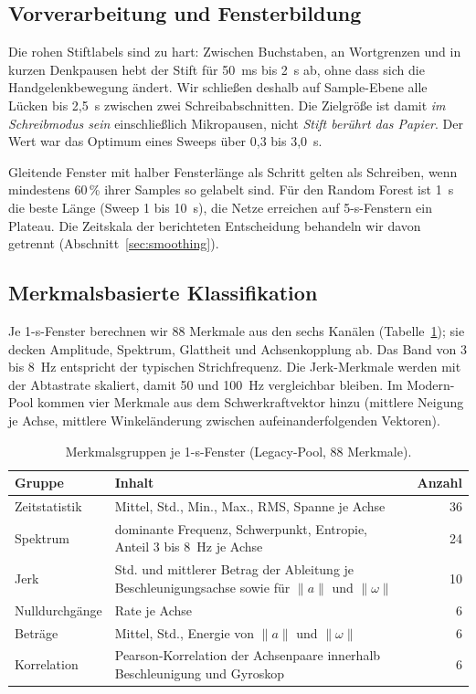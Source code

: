 \subsection{Vorverarbeitung und Fensterbildung}
\label{sec:windows}

Die rohen Stiftlabels sind zu hart: Zwischen Buchstaben, an Wortgrenzen und
in kurzen Denkpausen hebt der Stift für 50~ms bis 2~s ab, ohne dass sich die
Handgelenkbewegung ändert. Wir schließen deshalb auf Sample-Ebene alle Lücken
bis 2,5~s zwischen zwei Schreibabschnitten. Die Zielgröße ist damit \emph{im
Schreibmodus sein} einschließlich Mikropausen, nicht \emph{Stift berührt das
Papier}. Der Wert war das Optimum eines Sweeps über 0,3 bis 3,0~s.

Gleitende Fenster mit halber Fensterlänge als Schritt gelten als Schreiben,
wenn mindestens 60\,\% ihrer Samples so gelabelt sind. Für den Random Forest
ist 1~s die beste Länge (Sweep 1 bis 10~s), die Netze erreichen auf
5-s-Fenstern ein Plateau. Die Zeitskala der berichteten Entscheidung
behandeln wir davon getrennt (Abschnitt~\ref{sec:smoothing}).

\subsection{Merkmalsbasierte Klassifikation}
\label{sec:rf}

Je 1-s-Fenster berechnen wir 88 Merkmale aus den sechs Kanälen
(Tabelle~\ref{tab:features}); sie decken Amplitude, Spektrum, Glattheit und
Achsenkopplung ab. Das Band von 3 bis 8~Hz entspricht der typischen
Strichfrequenz. Die Jerk-Merkmale werden mit der Abtastrate skaliert, damit
50 und 100~Hz vergleichbar bleiben. Im Modern-Pool kommen vier Merkmale aus
dem Schwerkraftvektor hinzu (mittlere Neigung je Achse, mittlere
Winkeländerung zwischen aufeinanderfolgenden Vektoren).

\begin{table}[H]
  \centering
  \caption{Merkmalsgruppen je 1-s-Fenster (Legacy-Pool, 88 Merkmale).}
  \label{tab:features}
  \small
  \begin{tabular}{p{28mm}p{95mm}r}
    \hline
    \textbf{Gruppe} & \textbf{Inhalt} & \textbf{Anzahl} \\ \hline \hline
    Zeitstatistik & Mittel, Std., Min., Max., RMS, Spanne je Achse & 36 \\
    Spektrum & dominante Frequenz, Schwerpunkt, Entropie, Anteil 3 bis 8~Hz je Achse & 24 \\
    Jerk & Std. und mittlerer Betrag der Ableitung je Beschleunigungsachse sowie für $\|a\|$ und $\|\omega\|$ & 10 \\
    Nulldurchgänge & Rate je Achse & 6 \\
    Beträge & Mittel, Std., Energie von $\|a\|$ und $\|\omega\|$ & 6 \\
    Korrelation & Pearson-Korrelation der Achsenpaare innerhalb Beschleunigung und Gyroskop & 6 \\ \hline
  \end{tabular}
\end{table}

